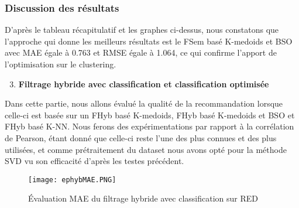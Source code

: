 \subsubsection*{Discussion des résultats}
D'après le tableau récapitulatif et les graphes ci-dessus, nous constatons que l'approche qui donne les meilleurs résultats est le FSem basé K-medoids et BSO avec MAE égale à 0.763 et RMSE égale à 1.064, ce qui confirme l'apport de l'optimisation sur le clustering.\\


\begin{enumerate}[nosep,label=\textbf{\arabic*)}]
	  \setcounter{enumi}{2}
	\item \textbf{Filtrage hybride avec classification et classification optimisée}
\end{enumerate}\mbox{}\indent Dans cette partie, nous allons évalué la qualité de la recommandation lorsque celle-ci est basée sur un FHyb basé K-medoids, FHyb basé K-medoids et BSO et FHyb basé K-NN.  Nous ferons des expérimentations par rapport à la corrélation de Pearson, étant donné que celle-ci reste l’une des plus connues et des plus utilisées, et comme prétraitement du dataset nous avons opté pour la méthode SVD vu son efficacité d'après les testes précédent.

\begin{figure}[H]
	\centering
	\texttt{[image: ephybMAE.PNG]}
	\caption{Évaluation MAE du filtrage hybride avec classification sur RED}
	\label{fig:ephybMAE}
\end{figure}



